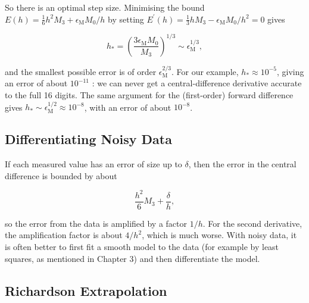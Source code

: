 \begin{lemma}
  So there is an optimal step size. Minimising the bound \(E(h)=\frac{1}{6} h^2 M_3+\epsilon_{\mathrm{M}} M_0 / h\) by setting \(E^{\prime}(h)=\frac{1}{3} h M_3-\epsilon_{\mathrm{M}} M_0 / h^2=0\) gives

\[
h_*=\left(\frac{3 \epsilon_{\mathrm{M}} M_0}{M_3}\right)^{1 / 3} \sim \epsilon_{\mathrm{M}}^{1 / 3},
\]

and the smallest possible error is of order \(\epsilon_{\mathrm{M}}^{2 / 3}\). For our example, \(h_* \approx 10^{-5}\), giving an error of about \(10^{-11}\) : we can never get a central-difference derivative accurate to the full 16 digits. The same argument for the (first-order) forward difference gives \(h_* \sim \epsilon_{\mathrm{M}}^{1 / 2} \approx 10^{-8}\), with an error of about \(10^{-8}\).
\end{lemma}

\subsection{Differentiating Noisy Data}

\begin{definition}

If each measured value has an error of size up to \(\delta\), then the error in the central difference is bounded by about

\[
\frac{h^2}{6} M_3+\frac{\delta}{h},
\]

so the error from the data is amplified by a factor \(1 / h\). For the second derivative, the amplification factor is about \(4 / h^2\), which is much worse. With noisy data, it is often better to first fit a smooth model to the data (for example by least squares, as mentioned in Chapter 3) and then differentiate the model.
  
\end{definition}  

\subsection{Richardson Extrapolation}

